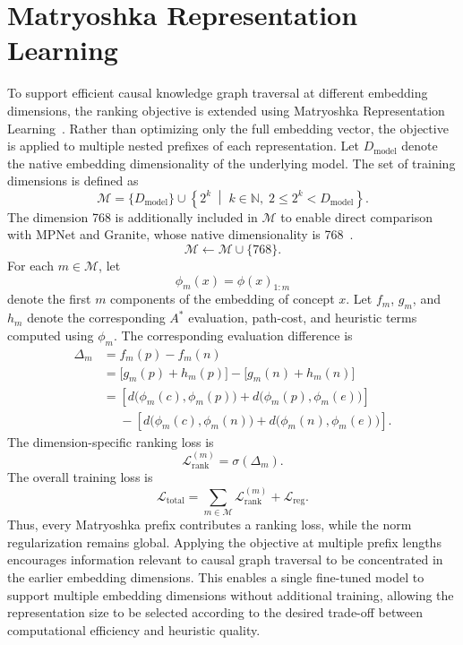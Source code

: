 \section{Matryoshka Representation Learning}
\label{sec:train_matryoshka}

To support efficient causal knowledge graph traversal at different embedding dimensions, the ranking objective is extended using Matryoshka Representation Learning~\cite{kusupati:2022}. Rather than optimizing only the full embedding vector, the objective is applied to multiple nested prefixes of each representation. Let $D_{\mathrm{model}}$ denote the native embedding dimensionality of the underlying model. The set of training dimensions is defined as
\[
\mathcal{M}
=
\{D_{\mathrm{model}}\}
\cup
\left\{
2^k
\;\middle|\;
k\in\mathbb{N},\;
2\leq 2^k<D_{\mathrm{model}}
\right\}.
\]
The dimension 768 is additionally included in $\mathcal{M}$ to enable direct comparison with MPNet and Granite, whose native dimensionality is 768~\cite{allmpnet:modelcard,granite:modelcard}.
\[
\mathcal{M}\gets\mathcal{M}\cup\{768\}.
\]
For each $m\in\mathcal{M}$, let
\[
\phi_m(x)=\phi(x)_{1:m}
\]
denote the first $m$ components of the embedding of concept $x$. Let $f_m$, $g_m$, and $h_m$ denote the corresponding $A^*$ evaluation, path-cost, and heuristic terms computed using $\phi_m$. The corresponding evaluation difference is
\[
\begin{aligned}
\Delta_m &= f_m(p)-f_m(n) \\
&= \bigl[g_m(p)+h_m(p)\bigr]-\bigl[g_m(n)+h_m(n)\bigr] \\
&=
\left[
d\bigl(\phi_m(c),\phi_m(p)\bigr)
+
d\bigl(\phi_m(p),\phi_m(e)\bigr)
\right]
\\
&\phantom{=}
-
\left[
d\bigl(\phi_m(c),\phi_m(n)\bigr)
+
d\bigl(\phi_m(n),\phi_m(e)\bigr)
\right].
\end{aligned}
\]
The dimension-specific ranking loss is
\[
\mathcal{L}_{\mathrm{rank}}^{(m)}
=
\sigma(\Delta_m).
\]
The overall training loss is
\[
\mathcal{L}_{\mathrm{total}}
=
\sum_{m\in\mathcal{M}}
\mathcal{L}_{\mathrm{rank}}^{(m)}
+
\mathcal{L}_{\mathrm{reg}}.
\]
Thus, every Matryoshka prefix contributes a ranking loss, while the norm regularization remains global. Applying the objective at multiple prefix lengths encourages information relevant to causal graph traversal to be concentrated in the earlier embedding dimensions. This enables a single fine-tuned model to support multiple embedding dimensions without additional training, allowing the representation size to be selected according to the desired trade-off between computational efficiency and heuristic quality.


